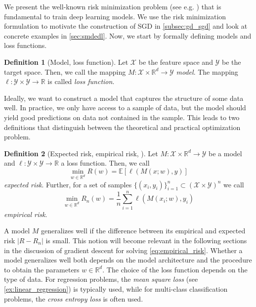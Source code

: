 \documentclass[12pt]{article}
\theoremstyle{definition}
\newtheorem{definition}[definition]{Definition}
\numberwithin{equation}{section}
\newcommand{\R}{\mathbb{R}}
\newcommand{\ev}[1]{\mathbb{E}\left[{#1}\right]}
\begin{document}
We present the well-known risk minimization problem (see e.g. \cite{bottouOptimizationMethodsLargeScale2018}) that is fundamental to train deep learning models. We use the risk minimization formulation to motivate the construction of SGD in \autoref{subsec:gd_sgd} and look at concrete examples in \autoref{sec:smdedl}. Now, we start by formally defining models and loss functions.
\begin{definition}[Model, loss function]
  Let $\mathcal{X}$ be the feature space and $\mathcal{Y}$ be the target space. Then, we call the mapping $M : \mathcal{X} \times \R^d \rightarrow \mathcal{Y}$ \emph{model}. The mapping $\ell : \mathcal{Y} \times \mathcal{Y} \rightarrow \R$ is called \emph{loss function}.
\end{definition}
Ideally, we want to construct a model that captures the structure of some data well. In practice, we only have access to a sample of data, but the model should yield good predictions on data not contained in the sample. This leads to two definitions that distinguish between the theoretical and practical optimization problem.
\begin{definition}[Expected risk, empirical risk, ]
  Let $M : \mathcal{X} \times \R^d \rightarrow \mathcal{Y}$ be a model and $\ell : \mathcal{Y} \times \mathcal{Y} \rightarrow \R$ a loss function. Then, we call
  \begin{equation}
  \min_{w \in \R^d} R(w) = \ev{\ell(M(x;w),y)}
\end{equation}
\emph{expected risk}. Further, for a set of samples $\{(x_i, y_i)\}_{i=1}^n \subset (\mathcal{X} \times  \mathcal{Y})^n$ we call
\begin{equation}
  \label{eq:empirical_risk}
  \min_{w \in \R^d}  R_n(w) = \frac{1}{n}\sum_{i=1}^n\ell(M(x_i;w),y_i)
\end{equation}
\emph{empirical risk}.
\end{definition}
A model $M$ generalizes well if the difference between its empirical and expected risk $|R - R_n|$ is small. This notion will become relevant in the following sections in the discussion of gradient descent for solving \eqref{eq:empirical_risk}. Whether a model generalizes well both depends on the model architecture and the procedure to obtain the parameters $w \in \R^d$. 
The choice of the loss function depends on the type of data. For regression problems, the \emph{mean square loss} (see \autoref{ex:linear_regression}) is typically used, while for multi-class classification problems, the \emph{cross entropy loss} is often used.
\end{document}

